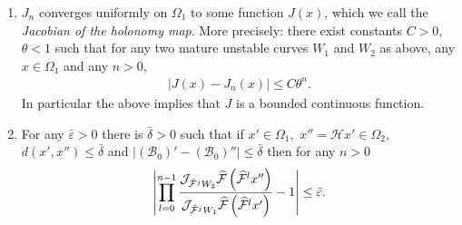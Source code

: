 \documentclass[AHL, Unicode, longabstracts,published]{cedram}
\newcommand{\cB}{\mathcal{B}}
\newcommand{\pslope}{\mathcal{B}}
\newcommand{\cm}{\mathcal{F}}
\newcommand{\hol}{\mathcal{H}}
\newcommand{\cmp}{\hat\cm}
\newcommand{\breps}{\bar{\varepsilon}}
\newcommand{\brdelta}{\bar{\delta}}
\newcommand{\ppPrivate}[2]{#1^{#2}}
\newcommand{\prePrivate}[1]{\ppPrivate{#1}{-}}
\newcommand{\prpslope}{\prePrivate{\pslope}}
\newcommand{\jac}[1]{\mathcal{J}_{#1}}
\renewcommand{\prpslope}{\cB}
\renewcommand{\prpslope}{\cB}
\renewcommand{\prpslope}{\cB}
\newcommand*{\relabel}{\renewcommand{\labelenumi}{(\theenumi)}}
\newcommand*{\alphenumi}{\renewcommand*{\theenumi}{\alph{enumi}}\relabel}
\let\oldhat\hat
\renewcommand*{\hat}[1]{\mathchoice{\widehat{#1}}{\widehat{#1}}{\oldhat{#1}}{\oldhat{#1}}}
\begin{document}
\pagebreak
\begin{lemm}\label{LmJak}\leavevmode
\begin{enumerate}\alphenumi
\item\label{lemm5.12.1} $J_{n}$ converges uniformly on $\Omega_{1}$ to some function $J(x)$, which we call the \emph{Jacobian of the holonomy map}. More precisely: there exist constants $C>0$, $\theta<1$ such that for any two mature unstable curves $W_{1}$ and $W_{2}$ as above, any $x\in\Omega_{1}$ and any $n > 0$,
\begin{align*}
\left|J(x)-J_{n}(x) \right| \leq C \theta^n.
\end{align*}
In particular the above implies that $J$ is a bounded continuous function.

\item\label{lemm5.12.2} For any $\breps>0$ there is $ \brdelta>0$ such that if $x'\in \Omega_1,$ $x'' = \hol{}x'\in \Omega_2, $ $d(x', x'')\leq \brdelta$ and $|(\prpslope_0)'-(\prpslope_0)''|\leq \brdelta$ then for any $n > 0$
\begin{align*}
\left| \prod_{l=0}^{n-1} \frac{\jac{\cmp^{j}W_{2}}\cmp\left(\cmp^l x''\right)} {\jac{\cmp^{j}W_{1}}\cmp\left(\cmp^l x'\right)}-1\right|\leq\breps.
\end{align*}
\end{enumerate}
\end{lemm}
\end{document}
